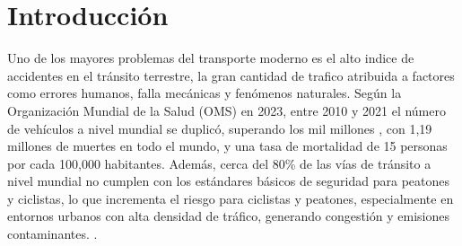 \documentclass[lettersize, journal]{IEEEtran}
\begin{document}
\section{Introducción}
Uno de los mayores problemas del transporte moderno es el alto indice de accidentes en el tránsito terrestre, la gran cantidad de trafico atribuida a factores como errores humanos, falla mecánicas y fenómenos naturales. Según la Organización Mundial de la Salud (OMS) en 2023, entre 2010 y 2021 el número de vehículos a nivel mundial se duplicó, superando los mil millones \cite{Accidentes}, con 1,19 millones de muertes en todo el mundo, y una tasa de mortalidad de 15 personas por cada 100,000 habitantes. Además, cerca del 80\% de las vías de tránsito a nivel mundial no cumplen con los estándares básicos de seguridad para peatones y ciclistas, lo que incrementa el riesgo para ciclistas y peatones, especialmente en entornos urbanos con alta densidad de tráfico, generando congestión y emisiones contaminantes. \cite{montezuma2008derecho, diaz2015infraestructuras}.

\end{document}
